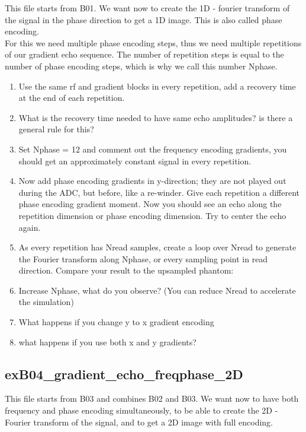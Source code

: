 \documentclass[a4paper,12pt]{extarticle}
\begin{document}
This file starts from B01. We want now to create the 1D - fourier transform of the signal in the phase direction to get a 1D image.
This is also called phase encoding. \\
For this we need multiple phase encoding steps, thus we need multiple repetitions of our gradient echo sequence. The number of repetition steps is equal to the number of phase encoding steps, which is why we call this number Nphase.
\begin{enumerate}
\item  Use the same rf and gradient blocks in every repetition, add a recovery time at the end of each repetition.
\item  What is the recovery time needed to have same echo amplitudes? is there a general rule for this? 
\item  Set Nphase = 12 and comment out the frequency encoding gradients, you should get an approximately constant signal in every repetition.
\item Now add phase encoding gradients in y-direction; they are not played out during the ADC, but before, like a re-winder. Give each repetition a different phase encoding gradient moment. Now you should see an echo along the repetition dimension or phase encoding dimension. Try to center the echo again.

\item As every repetition has Nread samples, create a loop over Nread to generate the Fourier transform along Nphase, or every sampling point in read direction. Compare your result to the upsampled phantom:
    
\item Increase Nphase, what do you observe?  (You can reduce Nread to accelerate the simulation)

\item What happens if you change y to x gradient encoding
\item what happens if you use both x and y gradients?
\end{enumerate}

\subsection{exB04\_gradient\_echo\_freqphase\_2D}
This file starts from B03 and combines B02 and B03.
We want now to have both frequency and phase encoding simultaneously,
to be able to create the 2D - Fourier transform of the signal,
and to get a 2D image with full encoding.
\end{document}
